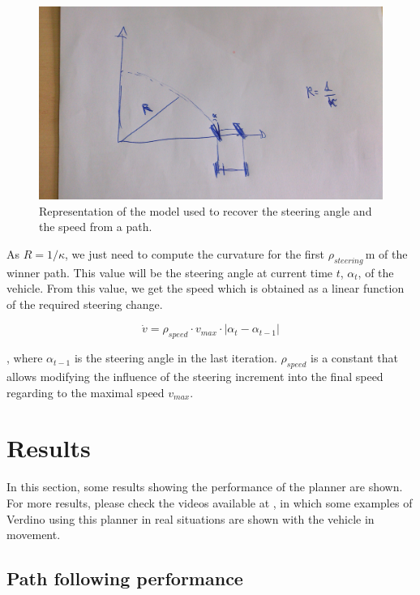\begin{figure}[h!]
  \centering
  \includegraphics{vehicle_commands}
  \caption{Representation of the model used to recover the steering angle and the speed from a path.}\label{fig:cp07_vehicle_commands}
\end{figure}

As $R = 1 / \kappa$, we just need to compute the curvature for the first $\rho_{steering}$\,m of the winner path. This value will be the steering angle at current time $t$, $\alpha_{t}$, of the vehicle. From this value, we get the speed which is obtained as a linear function of the required steering change.

\begin{equation}\label{eq:cp07_speed_computation}
\dot{v} = \rho_{speed} \cdot v_{max} \cdot | \alpha_{t} - \alpha_{t - 1}|
\end{equation}

, where $\alpha_{t - 1}$ is the steering angle in the last iteration. $\rho_{speed}$ is a constant that allows modifying the influence of the steering increment into the final speed regarding to the maximal speed $v_{max}$.

\section{Results}\label{ch:chapter07_02}

In this section, some results showing the performance of the planner are shown. For more results, please check the videos available at , in which some examples of Verdino using this planner in real situations are shown with the vehicle in movement.

\subsection{Path following performance}\label{ch:chapter07_02_01}

